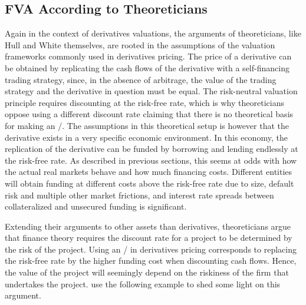 \documentclass[main.tex]{subfiles}
\begin{document}
        \subsection{FVA According to Theoreticians}
            Again in the context of derivatives valuations, 
            the arguments of theoreticians, like Hull and White themselves, 
            are rooted in the assumptions of the valuation frameworks commonly used in derivatives pricing.
            The price of a derivative can be obtained by replicating the cash flows of the derivative 
            with a self-financing trading strategy, since, in the absence of arbitrage, 
            the value of the trading strategy and the derivative in question must be equal.
            The risk-neutral valuation principle requires discounting at the risk-free rate,
            which is why theoreticians oppose using a different discount rate
            claiming that there is no theoretical basis for making an \FVA/.
            The assumptions in this theoretical setup is however 
            that the derivative exists in a very specific economic environment. 
            In this economy, the replication of the derivative
            can be funded by borrowing and lending endlessly at the risk-free rate.
            As described in previous sections,
            this seems at odds with how the actual real markets behave and how much financing costs.
            Different entities will obtain funding at different costs above the risk-free rate due to size,
            default risk and multiple other market frictions,
            and interest rate spreads between collateralized and unsecured funding is significant.

            Extending their arguments to other assets than derivatives, 
            theoreticians argue that finance theory requires the discount rate for a project 
            to be determined by the risk of the project.
            Using an \FVA/ in derivatives pricing corresponds to replacing the risk-free rate by the higher funding cost
            when discounting cash flows.
            Hence, the value of the project will seemingly depend on the riskiness of the firm that undertakes the project.
            \textcite{HullWhite2012FVA} use the following example to shed some light on this argument.
\end{document}
